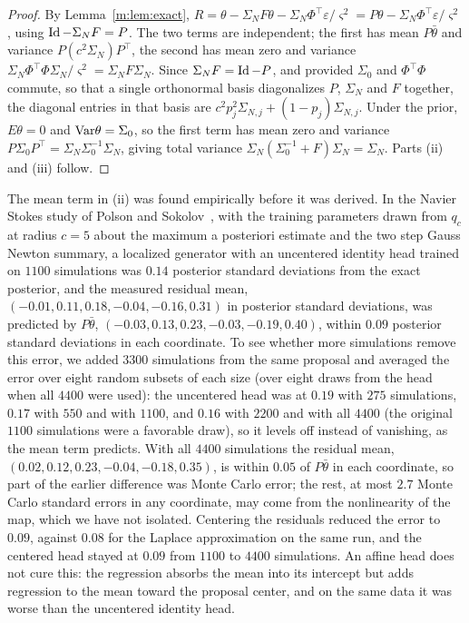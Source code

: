 \begin{proof}
By Lemma~\ref{m:lem:exact}, $R=\theta-\Sigma_NF\theta-\Sigma_N\Phi^\top\varepsilon/\varsigma^2=P\theta-\Sigma_N\Phi^\top\varepsilon/\varsigma^2$, using $\operatorname{Id}-\Sigma_NF=P$. The two terms are independent; the first has mean $P\bar\theta$ and variance $P(c^2\Sigma_N)P^\top$, the second has mean zero and variance $\Sigma_N\Phi^\top\Phi\Sigma_N/\varsigma^2=\Sigma_NF\Sigma_N$. Since $\Sigma_NF=\operatorname{Id}-P$, and provided $\Sigma_0$ and $\Phi^\top\Phi$ commute, so that a single orthonormal basis diagonalizes $P$, $\Sigma_N$ and $F$ together, the diagonal entries in that basis are $c^2p_j^2\Sigma_{N,j}+(1-p_j)\Sigma_{N,j}$. Under the prior, $E\theta=0$ and $\mathrm{Var}\theta=\Sigma_0$, so the first term has mean zero and variance $P\Sigma_0P^\top=\Sigma_N\Sigma_0^{-1}\Sigma_N$, giving total variance $\Sigma_N(\Sigma_0^{-1}+F)\Sigma_N=\Sigma_N$. Parts (ii) and (iii) follow.
\end{proof}

The mean term in (ii) was found empirically before it was derived. In the Navier Stokes study of Polson and Sokolov~\cite{polsonsokolov2026}, with the training parameters drawn from $q_c$ at radius $c=5$ about the maximum a posteriori estimate and the two step Gauss Newton summary, a localized generator with an uncentered identity head trained on $1100$ simulations was $0.14$ posterior standard deviations from the exact posterior, and the measured residual mean, $(-0.01,0.11,0.18,-0.04,-0.16,0.31)$ in posterior standard deviations, was predicted by $P\bar\theta$, $(-0.03,0.13,0.23,-0.03,-0.19,0.40)$, within $0.09$ posterior standard deviations in each coordinate. To see whether more simulations remove this error, we added $3300$ simulations from the same proposal and averaged the error over eight random subsets of each size (over eight draws from the head when all $4400$ were used): the uncentered head was at $0.19$ with $275$ simulations, $0.17$ with $550$ and with $1100$, and $0.16$ with $2200$ and with all $4400$ (the original $1100$ simulations were a favorable draw), so it levels off instead of vanishing, as the mean term predicts. With all $4400$ simulations the residual mean, $(0.02,0.12,0.23,-0.04,-0.18,0.35)$, is within $0.05$ of $P\bar\theta$ in each coordinate, so part of the earlier difference was Monte Carlo error; the rest, at most $2.7$ Monte Carlo standard errors in any coordinate, may come from the nonlinearity of the map, which we have not isolated. Centering the residuals reduced the error to $0.09$, against $0.08$ for the Laplace approximation on the same run, and the centered head stayed at $0.09$ from $1100$ to $4400$ simulations. An affine head does not cure this: the regression absorbs the mean into its intercept but adds regression to the mean toward the proposal center, and on the same data it was worse than the uncentered identity head.

